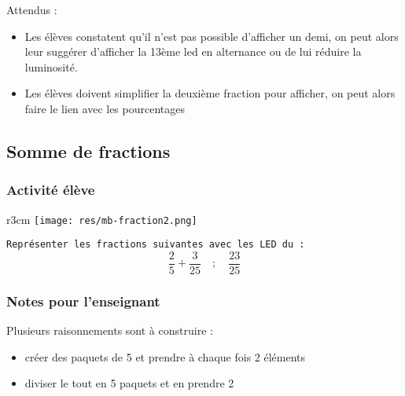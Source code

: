 Attendus :

\begin{itemize}
    \item Les élèves constatent qu’il n’est pas possible d’afficher un demi, on peut alors leur suggérer d’afficher la 13ème led en alternance ou de lui réduire la luminosité.
    \item Les élèves doivent simplifier la deuxième fraction pour afficher, on peut alors faire le lien avec les pourcentages
\end{itemize}


%
%
\newpage
\subsection{Somme de fractions}
\subsubsection{Activité élève}


%
%
\begin{wrapfigure}[4]{r}{3cm}
    \texttt{[image: res/mb-fraction2.png]}
\end{wrapfigure}

\begin{eleve}    
    \texttt{Représenter les fractions suivantes avec les LED du \mb :}
    $$
    \frac{2}{5} + \frac{3}{25} \quad ; \quad \frac{23}{25}
    $$
\end{eleve}

%
%
\subsubsection{Notes pour l'enseignant}

\begin{remarque}
Plusieurs raisonnements sont à construire :
\begin{itemize}
    \item créer des paquets de 5 et prendre à chaque fois 2 éléments 
    \item diviser le tout en 5 paquets et en prendre 2
    
\end{itemize}
    
\end{remarque}